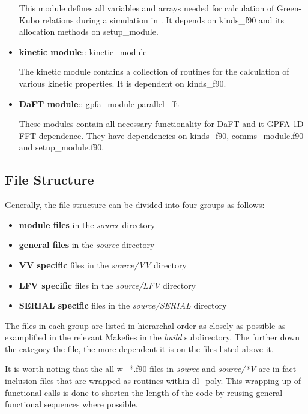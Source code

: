 \begin{itemize}
This module defines all variables and arrays needed for calculation
of Green-Kubo relations during a simulation in \D.  It depends on
{\sc kinds\_f90} and its allocation methods on {\sc setup\_module}.

\item {\bf kinetic module}:: {\sc kinetic\_module}

The kinetic module contains a collection of routines for the
calculation of various kinetic properties.
It is dependent on {\sc kinds\_f90}.

\item {\bf DaFT module}:: {\sc gpfa\_module parallel\_fft}

These modules contain all necessary functionality for \D DaFT and
it GPFA 1D FFT dependence.  They have dependencies on {\sc kinds\_f90},
{\sc comms\_module.f90} and {\sc setup\_module.f90}.

\end{itemize}

\subsection{File Structure}
\label{file-structure}

Generally, the \D file structure can be divided into four groups
as follows:
\begin{itemize}
\item {\bf module files} in the {\em source} directory
\item {\bf general files} in the {\em source} directory
\item {\bf VV specific} files in the {\em source/VV} directory
\item {\bf LFV specific} files in the {\em source/LFV} directory
\item {\bf SERIAL specific} files in the {\em source/SERIAL} directory
\end{itemize}
The files in each group are listed in hierarchal order as closely
as possible as examplified in the relevant \D Makefies in the
{\em build} subdirectory.  The further down the category the file,
the more dependent it is on the files listed above it.

It is worth noting that the all {\sc w\_*.f90} files in {\em source} and
{\em source/*V} are in fact inclusion files that are wrapped as routines
within {\sc dl\_poly}.  This wrapping up of functional calls is done to
shorten the length of the code by reusing general functional sequences
where possible.

